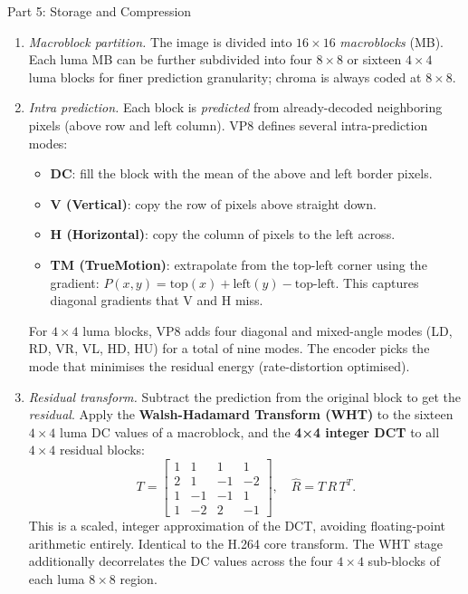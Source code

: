 \documentclass[letterpaper]{article}
\begin{document}
\begin{notes}{Part 5: Storage and Compression}
\begin{enumerate}
    \item \textit{Macroblock partition.} The image is divided into $16\times16$ \emph{macroblocks} (MB). Each luma MB can be further subdivided into four $8\times8$ or sixteen $4\times4$ luma blocks for finer prediction granularity; chroma is always coded at $8\times8$.

    \item \textit{Intra prediction.} Each block is \emph{predicted} from already-decoded neighboring pixels (above row and left column). VP8 defines several intra-prediction modes:
    \begin{itemize}
        \item \textbf{DC}: fill the block with the mean of the above and left border pixels.
        \item \textbf{V (Vertical)}: copy the row of pixels above straight down.
        \item \textbf{H (Horizontal)}: copy the column of pixels to the left across.
        \item \textbf{TM (TrueMotion)}: extrapolate from the top-left corner using the gradient: $P(x,y) = \text{top}(x) + \text{left}(y) - \text{top-left}$. This captures diagonal gradients that V and H miss.
    \end{itemize}
    For $4\times4$ luma blocks, VP8 adds four diagonal and mixed-angle modes (LD, RD, VR, VL, HD, HU) for a total of nine modes. The encoder picks the mode that minimises the residual energy (rate-distortion optimised).\\
    
    \item \textit{Residual transform.} Subtract the prediction from the original block to get the \emph{residual}. Apply the \textbf{Walsh-Hadamard Transform (WHT)} to the sixteen $4\times4$ luma DC values of a macroblock, and the \textbf{4×4 integer DCT} to all $4\times4$ residual blocks:
    $$T = \begin{bmatrix}1&1&1&1\\2&1&-1&-2\\1&-1&-1&1\\1&-2&2&-1\end{bmatrix}, \quad \hat{R} = T\,R\,T^T.$$
    This is a scaled, integer approximation of the DCT, avoiding floating-point arithmetic entirely. Identical to the H.264 core transform. The WHT stage additionally decorrelates the DC values across the four $4\times4$ sub-blocks of each luma $8\times8$ region.\\
    

\end{enumerate}
\end{notes}
\end{document}
